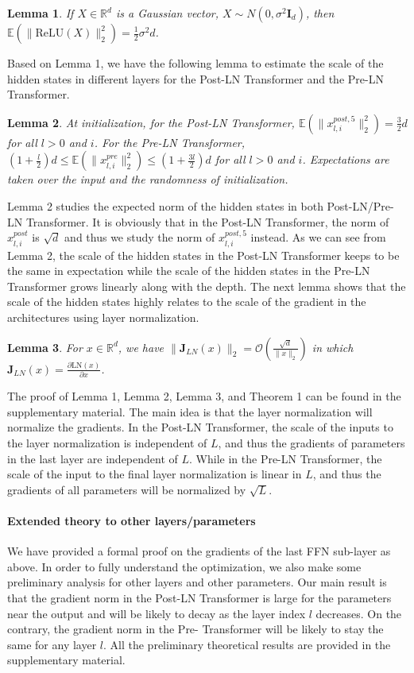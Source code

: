 \documentclass{article}
\newtheorem{lemma}{Lemma}
\begin{document}
\begin{lemma}\label{l1}
If $X\in \mathbb{R}^d$ is a Gaussian vector, $X\sim N(0,\sigma^2 \mathbf{I}_d)$, then $\mathbb{E}(\|\text{ReLU}(X)\|_2^2)=\frac{1}{2}\sigma^2 d$.
\end{lemma}

Based on Lemma 1, we have the following lemma to estimate the scale of the hidden states in different layers for the Post-LN Transformer and the Pre-LN Transformer.

\begin{lemma}
At initialization, for the Post-LN Transformer, $\mathbb{E}(\|x_{l,i}^{post,5}\|_2^2)=\frac{3}{2}d$ for all $l>0$ and $i$. For the Pre-LN Transformer, $(1+\frac{l}{2})d\leq\mathbb{E}(\|x^{pre}_{l,i}\|_2^2)\leq(1+\frac{3l}{2})d$ for all $l>0$ and $i$. Expectations are taken over the input and the randomness of initialization.
\end{lemma}

Lemma 2 studies the expected norm of the hidden states in both Post-LN/Pre-LN Transformer. It is obviously that in the Post-LN Transformer, the norm of $x_{l,i}^{post}$ is $\sqrt{d}$ and thus we study the norm of $x^{post,5}_{l,i}$ instead. As we can see from Lemma 2, the scale of the hidden states in the Post-LN Transformer keeps to be the same in expectation while the scale of the hidden states in the Pre-LN Transformer grows linearly along with the depth. The next lemma shows that the scale of the hidden states highly relates to the scale of the gradient in the architectures using layer normalization.

\begin{lemma}\label{l2}
For $x\in \mathbb{R}^d$, we have $\|\mathbf{J}_{LN}(x)\|_2=\mathcal{O}(\frac{\sqrt{d}}{\|x\|_2})$
in which $\mathbf{J}_{LN}(x)=\frac{\partial\text{LN}(x)}{\partial x}$.
\end{lemma}

The proof of Lemma 1, Lemma 2, Lemma 3, and Theorem 1 can be found in the supplementary material. The main idea is that the layer normalization will normalize the gradients. In the Post-LN Transformer, the scale of the inputs to the layer normalization is independent of $L$, and thus the gradients of parameters in the last layer are independent of $L$. While in the Pre-LN Transformer, the scale of the input to the final layer normalization is linear in $L$, and thus the gradients of all parameters will be normalized by $\sqrt{L}$.

\paragraph{Extended theory to other layers/parameters}
We have provided a formal proof on the gradients of the last FFN sub-layer as above. In order to fully understand the optimization, we also make some preliminary analysis for other layers and other parameters. Our main result is that the gradient norm in the Post-LN Transformer is large for the parameters near the output and will be likely to decay as the layer index $l$ decreases. On the contrary, the gradient norm in the Pre- Transformer will be likely to stay the same for any layer $l$. All the preliminary theoretical results are provided in the supplementary material.
\end{document}
